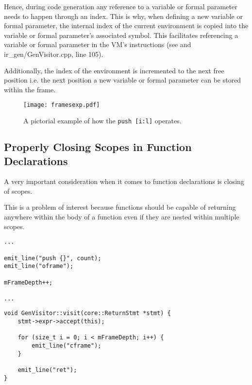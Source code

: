Hence, during code generation any reference to a variable or
formal parameter needs to happen through an index. This is why,
when defining a new variable or formal parameter, the internal
index of the current environment is copied into the variable or
formal parameter's  associated symbol. This facilitates
referencing a variable or formal parameter in the VM's
instructions (see  and
ir\_gen/GenVisitor.cpp, line 105).

Additionally, the index of the environment is incremented to the
next free position i.e. the next position a new variable or
formal parameter can be stored within the frame.

\begin{figure}[H]
\centering
\begin{mdframed}[backgroundcolor=OffWhite]
\texttt{[image: framesexp.pdf]}
\end{mdframed}
\caption{A pictorial example of how the \mbox{\texttt{push
[i:l]}} operates.}
\label{fig:framesexp}
\end{figure}

\subsection{Properly Closing Scopes in Function Declarations}

A very important consideration when it comes to
function declarations is closing of scopes.

This is a problem of interest because functions should be
capable of returning anywhere within the body of a function even
if they are nested within multiple scopes.

\begin{lstlisting}[caption={A segment of the
\texttt{visit(Program *)} method in the \texttt{GenVisitor}
class (ir\_gen/GenVisitor.cpp).}, label=lst:framedepth]
...

emit_line("push {}", count);
emit_line("oframe");

mFrameDepth++;

...
\end{lstlisting}


\begin{lstlisting}[caption={The \texttt{visit(ReturnStmt *)}
method in the \texttt{GenVisitor} class
(ir\_gen/GenVisitor.cpp).}, label=lst:retstmt]
void GenVisitor::visit(core::ReturnStmt *stmt) {
    stmt->expr->accept(this);

    for (size_t i = 0; i < mFrameDepth; i++) {
        emit_line("cframe");
    }

    emit_line("ret");
}
\end{lstlisting}

